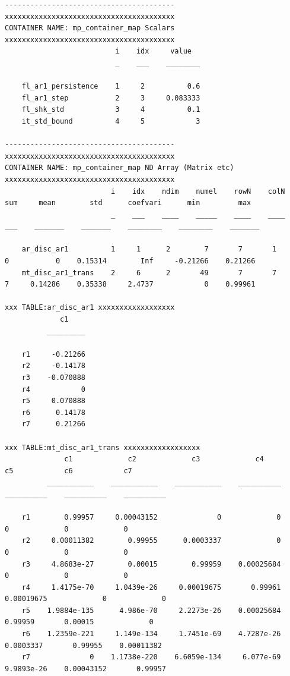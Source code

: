 \documentclass[
]{book}
\begin{document}
\begin{verbatim}
----------------------------------------
xxxxxxxxxxxxxxxxxxxxxxxxxxxxxxxxxxxxxxxx
CONTAINER NAME: mp_container_map Scalars
xxxxxxxxxxxxxxxxxxxxxxxxxxxxxxxxxxxxxxxx
                          i    idx     value  
                          _    ___    ________

    fl_ar1_persistence    1     2          0.6
    fl_ar1_step           2     3     0.083333
    fl_shk_std            3     4          0.1
    it_std_bound          4     5            3

----------------------------------------
xxxxxxxxxxxxxxxxxxxxxxxxxxxxxxxxxxxxxxxx
CONTAINER NAME: mp_container_map ND Array (Matrix etc)
xxxxxxxxxxxxxxxxxxxxxxxxxxxxxxxxxxxxxxxx
                         i    idx    ndim    numel    rowN    colN    sum     mean        std      coefvari      min         max  
                         _    ___    ____    _____    ____    ____    ___    _______    _______    ________    ________    _______

    ar_disc_ar1          1     1      2        7       7       1       0           0    0.15314        Inf     -0.21266    0.21266
    mt_disc_ar1_trans    2     6      2       49       7       7       7     0.14286    0.35338     2.4737            0    0.99961

xxx TABLE:ar_disc_ar1 xxxxxxxxxxxxxxxxxx
             c1    
          _________

    r1     -0.21266
    r2     -0.14178
    r3    -0.070888
    r4            0
    r5     0.070888
    r6      0.14178
    r7      0.21266

xxx TABLE:mt_disc_ar1_trans xxxxxxxxxxxxxxxxxx
              c1             c2             c3             c4            c5            c6            c7    
          ___________    ___________    ___________    __________    __________    __________    __________

    r1        0.99957     0.00043152              0             0             0             0             0
    r2     0.00011382        0.99955      0.0003337             0             0             0             0
    r3     4.8683e-27        0.00015        0.99959    0.00025684             0             0             0
    r4     1.4175e-70     1.0439e-26     0.00019675       0.99961    0.00019675             0             0
    r5    1.9884e-135      4.986e-70     2.2273e-26    0.00025684       0.99959       0.00015             0
    r6    1.2359e-221     1.149e-134     1.7451e-69    4.7287e-26     0.0003337       0.99955    0.00011382
    r7              0    1.1738e-220    6.6059e-134     6.077e-69    9.9893e-26    0.00043152       0.99957


\end{verbatim}
\end{document}
